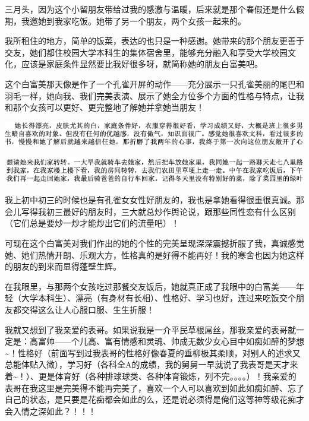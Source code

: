 \documentclass[9pt, b5paper]{article}
\begin{document}
三月头，因为这个小留朋友带给过我的感激与温暖，后来就是那个春假还是什么假期，我邀她到我家吃饭。她带了另一个朋友，两个女孩一起来的。 

我所租住的地方，简单的饭菜，表达的也只是一种感谢。她带来的那个朋友更善于交友，她们都住校园大学本科生的集体宿舍里，能够充分融入和享受大学校园文化，应该是家庭条件显然要比我好很多呀，就简称她的朋友白富美吧。

这个白富美那天像是作了一个孔雀开屏的动作——充分展示一只孔雀美丽的尾巴和羽毛一样，她向我、我们完美表演、展示了她全方位多个方面的性格与特点，让我和那个女孩可以更好、更完整地了解她并拿她当朋友！

\begin{center}
\includegraphics[width=.9\linewidth]{./pic/backups_plans_20210503_225816.png}
\end{center}

\begin{center}
\includegraphics[width=.9\linewidth]{./pic/backups_plans_20210503_225920.png}
\end{center}

我上初中初三的时候也是有孔雀女女性好朋友的，我也是拿她看得很重很真诚。那会儿写得我初三最好的朋友时，三大就总炒作舆论说，跟那些同性恋有什么区别（它们总是要炒一炒才能炒出它们的流量吧）！

可现在这个白富美对我们作出的她的个性的完美呈现深深震撼折服了我，真诚感觉她、她们热情开朗、乐观大方，性格真的是好得不能再好！我的寒舍也因为她这样的朋友的到来而显得蓬壁生辉。

在我眼里，与那两个女孩吃过那餐交友饭后，她就真正成了我眼中的白富美——年轻（大学本科生）、漂亮（有身材有长相）、性格好、学习也好，连过来吃饭交个朋友都交得这么让人心服口服、生生折服！

我就又想到了我亲爱的表哥。如果说我是一介平民草根屌丝，那我亲爱的表哥就一定是：高富帅——个儿高、富有情感和灵魂、帅成无数少女心目中如痴如醉的梦想\textasciitilde{}！性格好（前面写到过我表哥的性格好像春夏的垂柳极其柔顺，对别人的述求又总能体贴入微），学习好（各科全A的成绩，我的舅舅一早就说了我表哥是天才来着\textasciitilde{}！）、更是体育好（各种排球球类、各种体育锻炼，列不完。。。。）！我亲爱的表哥在我这里是完美得不能再完美了，喜欢一个人可以喜欢到如此如痴如醉、忘了自己的状态，是只要是花痴都会如此的么，还是说必须得是俺们这等神等级花痴才会入情之深如此？！！！
\end{document}
